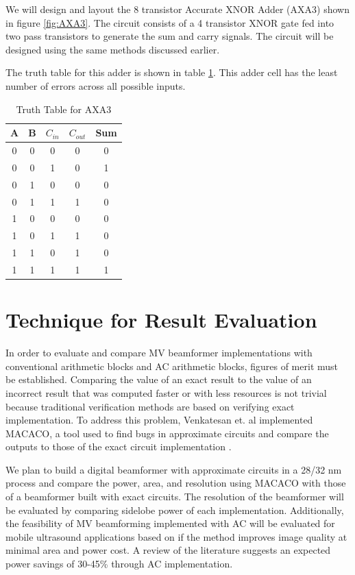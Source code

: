 \documentclass[journal]{IEEEtran}
\begin{document}
We will design and layout the 8 transistor Accurate XNOR Adder (AXA3) shown in figure \ref{fig:AXA3}. The circuit consists of a 4 transistor XNOR gate fed into two pass transistors to generate the sum and carry signals. The circuit will be designed using the same methods discussed earlier.

The truth table for this adder is shown in table \ref{tab:AXA3_Truth}. This adder cell has the least number of errors across all possible inputs.

\begin{table}
    \centering
    \begin{tabular}{c c c | c | c}
         A & B & $C_{in}$ & $C_{out}$ & Sum \\ \hline
         0 & 0 & 0 & 0 & 0 \\ 
         0 & 0 & 1 & 0 & 1 \\ 
         0 & 1 & 0 & 0 & \cellcolor{red!25}0 \\ 
         0 & 1 & 1 & 1 & 0 \\ 
         1 & 0 & 0 & 0 & \cellcolor{red!25}0 \\ 
         1 & 0 & 1 & 1 & 0 \\ 
         1 & 1 & 0 & 1 & 0 \\ 
         1 & 1 & 1 & 1 & 1 \\ 
    \end{tabular}
    
    \caption{Truth Table for AXA3}
    \label{tab:AXA3_Truth}
\end{table}

    

\section{Technique for Result Evaluation}

In order to evaluate and compare MV beamformer implementations with conventional arithmetic blocks and AC arithmetic blocks, figures of merit must be established. 
Comparing the value of an exact result to the value of an incorrect result that was computed faster or with less resources is not trivial because traditional verification methods are based on verifying exact implementation. To address this problem, Venkatesan et. al implemented MACACO, a tool used to find bugs in approximate circuits and compare the outputs to those of the exact circuit implementation \cite{venkatesan2011macaco}. 

We plan to build a digital beamformer with approximate circuits in a 28/32 \si{\nano\meter} process and compare the power, area, and resolution using MACACO with those of a beamformer built with exact circuits. The resolution of the beamformer will be evaluated by comparing sidelobe power of each implementation. Additionally, the feasibility of MV beamforming implemented with AC will be evaluated for mobile ultrasound applications based on if the method improves image quality at minimal area and power cost. A review of the literature suggests an expected power savings of 30-45\% through AC implementation.
\end{document}
